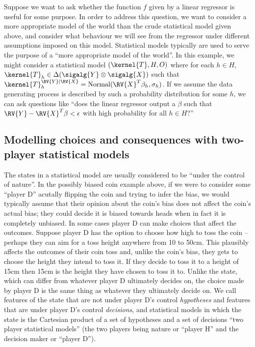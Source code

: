 Suppose we want to ask whether the function $f$ given by a linear regressor is useful for some purpose. In order to address this question, we want to consider a more appropriate model of the world than the crude statistical model given above, and consider what behaviour we will see from the regressor under different assumptions imposed on this model. Statistical models typically are used to serve the purpose of a ``more appropriate model of the world''. In this example, we might consider a statistical model $(\kernel{T},H,O)$ where for each $h\in H$, $\kernel{T}_h\in \Delta(\sigalg{Y}\otimes\sigalg{X})$ such that $\kernel{T}_h^{\RV{Y}|\RV{X}}=\text{Normal}(\RV{X}^T\beta_h,\sigma_h)$. If we assume the data generating process is described by such a probability distribution for some $h$, we can ask questions like ``does the linear regressor output a $\beta$ such that $\RV{Y}-\RV{X}^T\beta<\epsilon$ with high probability for all $h\in H$?''

\subsection{Modelling choices and consequences with two-player statistical models}

The states in a statistical model are usually considered to be ``under the control of nature''. In the possibly biased coin example above, if we were to consider some ``player D'' acutally flipping the coin and trying to infer the bias, we would typically assume that their opinion about the coin's bias does not affect the coin's actual bias; they could decide it is biased towards heads when in fact it is completely unbiased. In some cases player D can make choices that affect the outcomes. Suppose player D has the option to choose how high to toss the coin -- perhaps they can aim for a toss height anywhere from 10 to 50cm. This plausibly affects the outcomes of their coin toss and, unlike the coin's bias, they gets to choose the height they intend to toss it. If they decide to toss it to a height of 15cm then 15cm is the height they have chosen to toss it to. Unlike the state, which can differ from whatever player D ultimately decides on, the choice made by player D is the same thing as whatever they ultimately decide on. We call features of the state that are not under player D's control \emph{hypotheses} and features that are under player D's control \emph{decisions}, and statistical models in which the state is the Cartesian product of a set of hypotheses and a set of decisions ``two player statistical models'' (the two players being nature or ``player H'' and the decision maker or ``player D'').

